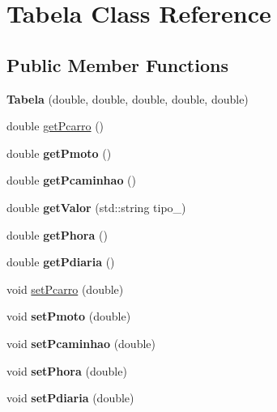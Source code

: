 \hypertarget{classTabela}{}\section{Tabela Class Reference}
\label{classTabela}
\subsection*{Public Member Functions}
\begin{DoxyCompactItemize}
\item 
\mbox{\label{classTabela_acfefae7145c115e4b6ed3537e0cc2e4b}} 
{\bfseries Tabela} (double, double, double, double, double)
\item 
double \hyperlink{classTabela_af8df006567638a44fec8e0951b794c4b}{get\+Pcarro} ()
\item 
\mbox{\label{classTabela_a6f65feced705027c6c4d695737e1f7f4}} 
double {\bfseries get\+Pmoto} ()
\item 
\mbox{\label{classTabela_a0167b9de146e9b60cc807912dd8a4652}} 
double {\bfseries get\+Pcaminhao} ()
\item 
\mbox{\label{classTabela_ac49c8952230be93b59e99f4852b8fd06}} 
double {\bfseries get\+Valor} (std\+::string tipo\+\_\+)
\item 
\mbox{\label{classTabela_a888b02d9fb45421a2574161c3c83e6db}} 
double {\bfseries get\+Phora} ()
\item 
\mbox{\label{classTabela_a7b8a7868ae2097482d8c9c1755fce914}} 
double {\bfseries get\+Pdiaria} ()
\item 
void \hyperlink{classTabela_a6b811be8b22906f261c7bfc93f39386b}{set\+Pcarro} (double)
\item 
\mbox{\label{classTabela_af3cb0073ed37888bf632746a06f574d0}} 
void {\bfseries set\+Pmoto} (double)
\item 
\mbox{\label{classTabela_a668364c58c09fafd78e55039e4b28252}} 
void {\bfseries set\+Pcaminhao} (double)
\item 
\mbox{\label{classTabela_ac105d1c55278046beba287ab8d7d925d}} 
void {\bfseries set\+Phora} (double)
\item 
\mbox{\label{classTabela_aebcda3f64c04af31a5b2b247714234f5}} 
void {\bfseries set\+Pdiaria} (double)
\end{DoxyCompactItemize}


